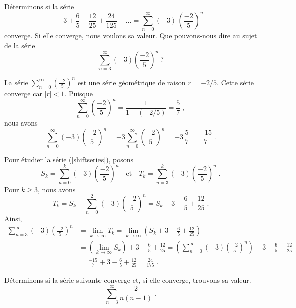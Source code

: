 {\begin{egg}[\eng]
Déterminons si la série
\[
-3+\frac{6}{5} -\frac{12}{25} + \frac{24}{125} - \ldots =
\sum_{n=0}^\infty (-3)\, \left(\frac{-2}{5}\right)^n
\]
converge.  Si elle converge, nous voulons sa valeur.  Que pouvons-nous
dire au sujet de la série
\begin{equation}\label{shiftseries}
\sum_{n=3}^\infty (-3)\left(\frac{-2}{5}\right)^n \ ?
\end{equation}

La série $\displaystyle \sum_{n=0}^\infty \left(\frac{-2}{5}\right)^n$ est une
série géométrique de raison $r = -2/5$.  Cette série converge car
$|r|<1$.  Puisque 
\[
\sum_{n=0}^\infty \left(\frac{-2}{5}\right)^n = \frac{1}{1-(-2/5)}
= \frac{5}{7} \; ,
\]
nous avons
\[
\sum_{n=0}^\infty (-3)\left(\frac{-2}{5}\right)^n
= -3 \sum_{n=0}^\infty \left(\frac{-2}{5}\right)^n
= -3 \, \frac{5}{7} = \frac{-15}{7} \; .
\]

Pour étudier la série (\ref{shiftseries}), posons
\[
S_k = \sum_{n=0}^k (-3)\left(\frac{-2}{5}\right)^n \quad \text{et}
\quad  T_k = \sum_{n=3}^k (-3)\left(\frac{-2}{5}\right)^n \; .
\]
Pour $k\geq 3$, nous avons
\[
T_k = S_k - \sum_{n=0}^2 (-3)\left(\frac{-2}{5}\right)^n
= S_k + 3 - \frac{6}{5} + \frac{12}{25} \; .
\]
Ainsi,
\begin{align*}
 \sum_{n=3}^\infty (-3)\left(\frac{-2}{5}\right)^n &=
\lim_{k\rightarrow \infty} T_k = \lim_{k\rightarrow \infty}
\left(S_k + 3 - \frac{6}{5} + \frac{12}{25} \right) \\
& = \left(\lim_{k\rightarrow \infty} S_k\right)
+ 3 - \frac{6}{5} + \frac{12}{25}
= \left( \sum_{n=0}^\infty (-3)\left(\frac{-2}{5}\right)^n \right)
+ 3 - \frac{6}{5} + \frac{12}{25} \\
& = \frac{-15}{7} + 3 - \frac{6}{5} + \frac{12}{25}
= \frac{24}{175} \; .
\end{align*}
\end{egg}

\begin{egg}
Déterminons si la série suivante converge et, si elle converge,
trouvons sa valeur.
\begin{equation}\label{telescope}
\sum_{n=3}^\infty \frac{2}{n(n-1)} \; .
\end{equation}


\end{egg}}
